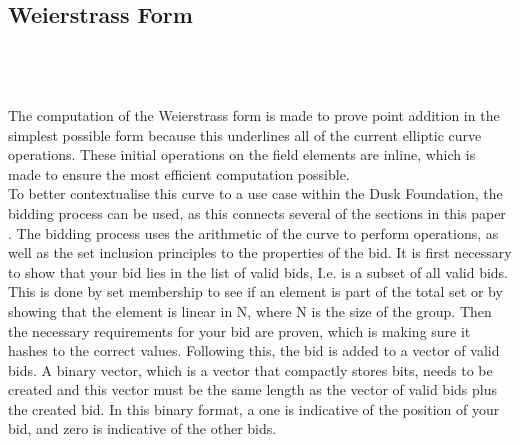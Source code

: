\documentclass{article}
\begin{document}
\subsection{Weierstrass Form}
\noindent{}\\\\\\
The computation of the Weierstrass form is made to prove point addition in the simplest possible form because this underlines all of the current elliptic curve operations. These initial operations on the field elements are inline, which is made to ensure the most efficient computation possible.\\

To better contextualise this curve to a use case within the Dusk Foundation, the bidding process can be used, as this connects several of the sections in this paper . The bidding process uses the arithmetic of the curve to perform operations, as well as the set inclusion principles to the properties of the bid. It is first necessary to show that your bid lies in the list of valid bids, I.e. is a subset of all valid bids. This is done by set membership to see if an element is part of the total set or by showing that the element is linear in N, where N is the size of the group. Then the necessary requirements for your bid are proven, which is making sure it hashes to the correct values. Following this, the bid is added to a vector of valid bids. A binary vector, which is a vector that compactly stores bits, needs to be created and this vector must be the same length as the vector of valid bids plus the created bid. In this binary format, a one is indicative of the position of your bid, and zero is indicative of the other bids.
\end{document}
